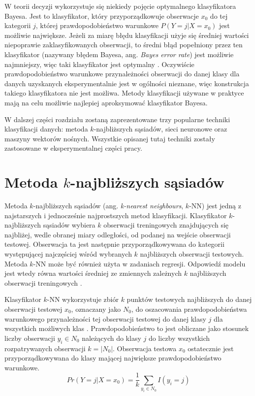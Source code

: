 \documentclass[notitlepage]{report}
\begin{document}
W teorii decyzji wykorzystuje się niekiedy pojęcie optymalnego klasyfikatora Bayesa. Jest to klasyfikator, który przyporządkowuje obserwacje $x_0$ do tej kategorii $j$, której prawdopodobieństwo warunkowe $P(Y = j|X = x_0)$ jest możliwie największe. Jeżeli za miarę błędu klasyfikacji użyje się średniej wartości niepoprawie zaklasyfikowanych obserwacji, to średni błąd popełniony przez ten klasyfikator (nazywany błędem Bayesa, ang. \textit{Bayes error rate}) jest możliwie najmniejszy, więc taki klasyfikator jest optymalny \cite{islr} \cite{eslii}. Oczywiście prawdopodobieństwo warunkowe przynależności obserwacji do danej klasy dla danych uzyskanych eksperymentalnie jest w ogólności nieznane, więc konstrukcja takiego klasyfikatora nie jest możliwa. Metody klasyfikacji używane w praktyce mają na celu możliwie najlepiej aproksymować klasyfikator Bayesa.

W dalszej części rozdziału zostaną zaprezentowane trzy popularne techniki klasyfikacji danych: metoda $k$-najbliższych sąsiadów, sieci neuronowe oraz maszyny wektorów nośnych. Wszystkie opisanej tutaj techniki zostały zastosowane w eksperymentalnej części pracy. 

\section{Metoda $k$-najbliższych sąsiadów}
Metoda $k$-najbliższych sąsiadów (ang. \textit{k-nearest neighbours}, $k$-NN) jest jedną z najstarszych i jednocześnie najprostszych metod klasyfikacji. Klasyfikator $k$-najbliższych sąsiadów wybiera $k$ obserwacji treningowych znajdujących się najbliżej, wedle obranej miary odległości, od podanej na wejście obserwacji testowej. Obserwacja ta jest następnie przyporządkowywana do kategorii występującej najczęściej wśród wybranych $k$ najbliższych obserwacji testowych. Metoda $k$-NN może być również użyta w zadaniach regresji. Odpowiedź modelu jest wtedy równa wartości średniej ze zmiennych zależnych $k$ najbliższych obserwacji treningowych \cite{islr} \cite{eslii}.

Klasyfikator $k$-NN wykorzystuje zbiór $k$ punktów testowych najbliższych do danej obserwacji testowej $x_0$, oznaczany jako $N_0$, do oszacowania prawdopodobieństwa warunkowego przynależności tej obserwacji testowej do danej klasy $j$ dla wszystkich możliwych klas \cite{islr}. Prawdopodobieństwo to jest obliczane jako stosunek liczby obserwacji $y_i \in N_0$ należących do klasy $j$ do liczby wszystkich rozpatrywanych obserwacji $k = |N_0|$. Obserwacja testowa $x_0$ ostatecznie jest przyporządkowywana do klasy mającej największe prawdopodobieństwo warunkowe. 
\begin{equation}
Pr(Y = j | X = x_0) = \frac{1}{k}\sum_{y_i\in N_0}I(y_i = j)
\end{equation}
\end{document}
